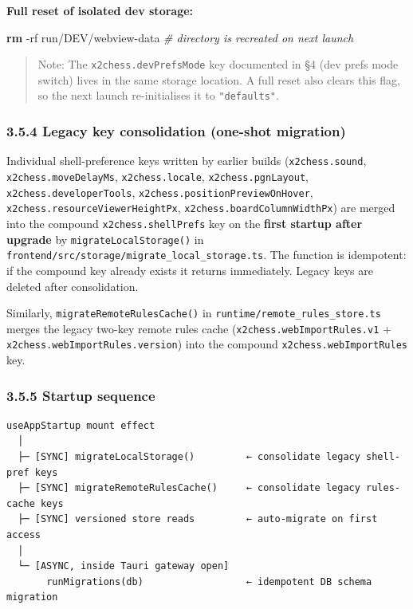 \documentclass[]{article}
\newenvironment{Shaded}{\begin{snugshade}}{\end{snugshade}}
\newcommand{\KeywordTok}[1]{\textcolor[rgb]{0.13,0.29,0.53}{\textbf{{#1}}}}
\newcommand{\CommentTok}[1]{\textcolor[rgb]{0.56,0.35,0.01}{\textit{{#1}}}}
\newcommand{\NormalTok}[1]{{#1}}
\begin{document}
\textbf{Full reset of isolated dev storage:}

\begin{Shaded}
\begin{Highlighting}[]
\KeywordTok{rm} \NormalTok{-rf run/DEV/webview-data   }\CommentTok{# directory is recreated on next launch}
\end{Highlighting}
\end{Shaded}

\begin{quote}
Note: The \texttt{x2chess.devPrefsMode} key documented in §4 (dev prefs
mode switch) lives in the same storage location. A full reset also
clears this flag, so the next launch re-initialises it to
\texttt{"defaults"}.
\end{quote}

\subsubsection{3.5.4 Legacy key consolidation (one-shot
migration)}\label{legacy-key-consolidation-one-shot-migration}

Individual shell-preference keys written by earlier builds
(\texttt{x2chess.sound}, \texttt{x2chess.moveDelayMs},
\texttt{x2chess.locale}, \texttt{x2chess.pgnLayout},
\texttt{x2chess.developerTools},
\texttt{x2chess.positionPreviewOnHover},
\texttt{x2chess.resourceViewerHeightPx},
\texttt{x2chess.boardColumnWidthPx}) are merged into the compound
\texttt{x2chess.shellPrefs} key on the \textbf{first startup after
upgrade} by \texttt{migrateLocalStorage()} in
\texttt{frontend/src/storage/migrate\_local\_storage.ts}. The function
is idempotent: if the compound key already exists it returns
immediately. Legacy keys are deleted after consolidation.

Similarly, \texttt{migrateRemoteRulesCache()} in
\texttt{runtime/remote\_rules\_store.ts} merges the legacy two-key
remote rules cache (\texttt{x2chess.webImportRules.v1} +
\texttt{x2chess.webImportRules.version}) into the compound
\texttt{x2chess.webImportRules} key.

\subsubsection{3.5.5 Startup sequence}\label{startup-sequence}

\begin{verbatim}
useAppStartup mount effect
  │
  ├─ [SYNC] migrateLocalStorage()         ← consolidate legacy shell-pref keys
  ├─ [SYNC] migrateRemoteRulesCache()     ← consolidate legacy rules-cache keys
  ├─ [SYNC] versioned store reads         ← auto-migrate on first access
  │
  └─ [ASYNC, inside Tauri gateway open]
       runMigrations(db)                  ← idempotent DB schema migration
\end{verbatim}
\end{document}
